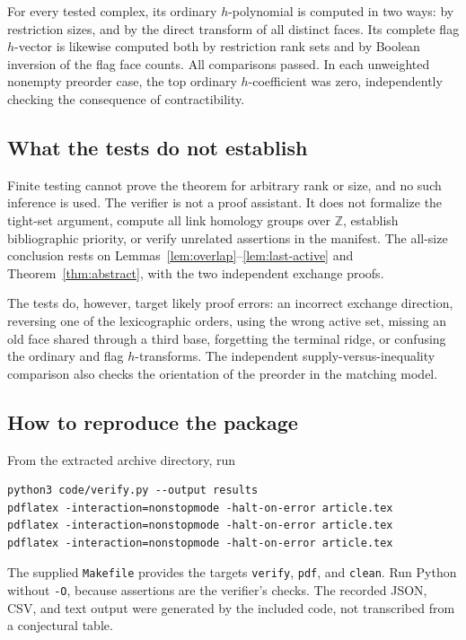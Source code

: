 \documentclass[11pt]{article}
\numberwithin{equation}{section}
\theoremstyle{definition}
\theoremstyle{remark}
\newcommand{\Z}{\mathbb Z}
\begin{document}
For every tested complex, its ordinary $h$-polynomial is computed in two
ways: by restriction sizes, and by the direct transform of all distinct
faces. Its complete flag $h$-vector is likewise computed both by restriction
rank sets and by Boolean inversion of the flag face counts. All comparisons
passed. In each unweighted nonempty preorder case, the top ordinary
$h$-coefficient was zero, independently checking the consequence of
contractibility.

\subsection{What the tests do not establish}

Finite testing cannot prove the theorem for arbitrary rank or size, and no
such inference is used. The verifier is not a proof assistant. It does not
formalize the tight-set argument, compute all link homology groups over
$\Z$, establish bibliographic priority, or verify unrelated assertions in the
manifest. The all-size conclusion rests on
Lemmas~\ref{lem:overlap}--\ref{lem:last-active} and
Theorem~\ref{thm:abstract}, with the two independent exchange proofs.

The tests do, however, target likely proof errors: an incorrect exchange
direction, reversing one of the lexicographic orders, using the wrong active
set, missing an old face shared through a third base, forgetting the terminal
ridge, or confusing the ordinary and flag $h$-transforms. The independent
supply-versus-inequality comparison also checks the orientation of the
preorder in the matching model.

\subsection{How to reproduce the package}

From the extracted archive directory, run
\begin{verbatim}
python3 code/verify.py --output results
pdflatex -interaction=nonstopmode -halt-on-error article.tex
pdflatex -interaction=nonstopmode -halt-on-error article.tex
pdflatex -interaction=nonstopmode -halt-on-error article.tex
\end{verbatim}
The supplied \texttt{Makefile} provides the targets \texttt{verify},
\texttt{pdf}, and \texttt{clean}. Run Python without \texttt{-O}, because
assertions are the verifier's checks. The recorded JSON, CSV, and text output
were generated by the included code, not transcribed from a conjectural table.
\end{document}
